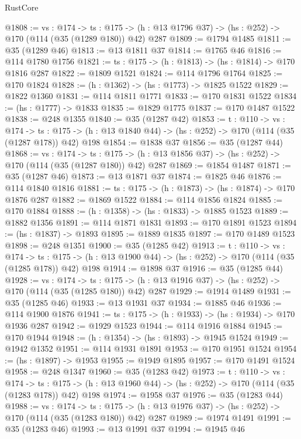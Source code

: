 \begin{lexlean}{RustCore}
\begin{coremodule}
@1808 := {vs : @174} ->
  {ts : @175} -> (h : @13 @1796 @37) -> (hs : @252) -> @170 (@114 (@35 (@1289 @180)) @42) @287
@1809 := @1794 @1485
@1811 := @35 (@1289 @46)
@1813 := @13 @1811 @37
@1814 := @1765 @46
@1816 := @114 @1780 @1756
@1821 := {ts : @175} -> (h : @1813) -> (hs : @1814) -> @170 @1816 @287
@1822 := @1809 @1521
@1824 := @114 @1796 @1764
@1825 := @170 @1824
@1828 := (h : @1362) -> (hs : @1773) -> @1825 @1522
@1829 := @1822 @1360
@1831 := @114 @1811 @1771
@1833 := @170 @1831 @1522
@1834 := (hs : @1777) -> @1833
@1835 := @1829 @1775
@1837 := @170 @1487 @1522
@1838 := @248 @1355
@1840 := @35 (@1287 @42)
@1853 := {t : @110} ->
  {vs : @174} ->
  {ts : @175} -> (h : @13 @1840 @44) -> (hs : @252) -> @170 (@114 (@35 (@1287 @178)) @42) @198
@1854 := @1838 @37
@1856 := @35 (@1287 @44)
@1868 := {vs : @174} ->
  {ts : @175} -> (h : @13 @1856 @37) -> (hs : @252) -> @170 (@114 (@35 (@1287 @180)) @42) @287
@1869 := @1854 @1487
@1871 := @35 (@1287 @46)
@1873 := @13 @1871 @37
@1874 := @1825 @46
@1876 := @114 @1840 @1816
@1881 := {ts : @175} -> (h : @1873) -> (hs : @1874) -> @170 @1876 @287
@1882 := @1869 @1522
@1884 := @114 @1856 @1824
@1885 := @170 @1884
@1888 := (h : @1358) -> (hs : @1833) -> @1885 @1523
@1889 := @1882 @1356
@1891 := @114 @1871 @1831
@1893 := @170 @1891 @1523
@1894 := (hs : @1837) -> @1893
@1895 := @1889 @1835
@1897 := @170 @1489 @1523
@1898 := @248 @1351
@1900 := @35 (@1285 @42)
@1913 := {t : @110} ->
  {vs : @174} ->
  {ts : @175} -> (h : @13 @1900 @44) -> (hs : @252) -> @170 (@114 (@35 (@1285 @178)) @42) @198
@1914 := @1898 @37
@1916 := @35 (@1285 @44)
@1928 := {vs : @174} ->
  {ts : @175} -> (h : @13 @1916 @37) -> (hs : @252) -> @170 (@114 (@35 (@1285 @180)) @42) @287
@1929 := @1914 @1489
@1931 := @35 (@1285 @46)
@1933 := @13 @1931 @37
@1934 := @1885 @46
@1936 := @114 @1900 @1876
@1941 := {ts : @175} -> (h : @1933) -> (hs : @1934) -> @170 @1936 @287
@1942 := @1929 @1523
@1944 := @114 @1916 @1884
@1945 := @170 @1944
@1948 := (h : @1354) -> (hs : @1893) -> @1945 @1524
@1949 := @1942 @1352
@1951 := @114 @1931 @1891
@1953 := @170 @1951 @1524
@1954 := (hs : @1897) -> @1953
@1955 := @1949 @1895
@1957 := @170 @1491 @1524
@1958 := @248 @1347
@1960 := @35 (@1283 @42)
@1973 := {t : @110} ->
  {vs : @174} ->
  {ts : @175} -> (h : @13 @1960 @44) -> (hs : @252) -> @170 (@114 (@35 (@1283 @178)) @42) @198
@1974 := @1958 @37
@1976 := @35 (@1283 @44)
@1988 := {vs : @174} ->
  {ts : @175} -> (h : @13 @1976 @37) -> (hs : @252) -> @170 (@114 (@35 (@1283 @180)) @42) @287
@1989 := @1974 @1491
@1991 := @35 (@1283 @46)
@1993 := @13 @1991 @37
@1994 := @1945 @46

\end{coremodule}
\end{lexlean}
